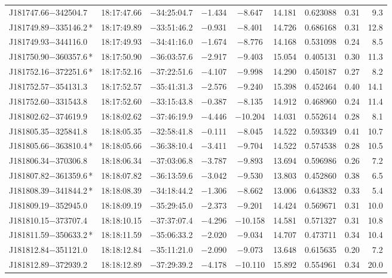 \begin{table*}
\begin{tabular}{lcccccccr}
J181747.66$-$342504.7 & 18:17:47.66 & $-$34:25:04.7 & $-$1.434 & $-$8.647 & 14.181 & 0.623088 & 0.31 & 9.3 \\
J181749.89$-$335146.2\,* & 18:17:49.89 & $-$33:51:46.2 & $-$0.931 & $-$8.401 & 14.726 & 0.686168 & 0.31 & 12.8 \\
J181749.93$-$344116.0 & 18:17:49.93 & $-$34:41:16.0 & $-$1.674 & $-$8.776 & 14.168 & 0.531098 & 0.24 & 8.5 \\
J181750.90$-$360357.6\,* & 18:17:50.90 & $-$36:03:57.6 & $-$2.917 & $-$9.403 & 15.054 & 0.405131 & 0.30 & 11.3 \\
J181752.16$-$372251.6\,* & 18:17:52.16 & $-$37:22:51.6 & $-$4.107 & $-$9.998 & 14.290 & 0.450187 & 0.27 & 8.2 \\
J181752.57$-$354131.3 & 18:17:52.57 & $-$35:41:31.3 & $-$2.576 & $-$9.240 & 15.398 & 0.452464 & 0.40 & 14.1 \\
J181752.60$-$331543.8 & 18:17:52.60 & $-$33:15:43.8 & $-$0.387 & $-$8.135 & 14.912 & 0.468960 & 0.24 & 11.4 \\
J181802.62$-$374619.9 & 18:18:02.62 & $-$37:46:19.9 & $-$4.446 & $-$10.204 & 14.031 & 0.552614 & 0.28 & 8.1 \\
J181805.35$-$325841.8 & 18:18:05.35 & $-$32:58:41.8 & $-$0.111 & $-$8.045 & 14.522 & 0.593349 & 0.41 & 10.7 \\
J181805.66$-$363810.4\,* & 18:18:05.66 & $-$36:38:10.4 & $-$3.411 & $-$9.704 & 14.522 & 0.574538 & 0.28 & 10.5 \\
J181806.34$-$370306.8 & 18:18:06.34 & $-$37:03:06.8 & $-$3.787 & $-$9.893 & 13.694 & 0.596986 & 0.26 & 7.2 \\
J181807.82$-$361359.6\,* & 18:18:07.82 & $-$36:13:59.6 & $-$3.042 & $-$9.530 & 13.803 & 0.452860 & 0.38 & 6.5 \\
J181808.39$-$341844.2\,* & 18:18:08.39 & $-$34:18:44.2 & $-$1.306 & $-$8.662 & 13.006 & 0.643832 & 0.33 & 5.4 \\
J181809.19$-$352945.0 & 18:18:09.19 & $-$35:29:45.0 & $-$2.373 & $-$9.201 & 14.424 & 0.569671 & 0.31 & 10.0 \\
J181810.15$-$373707.4 & 18:18:10.15 & $-$37:37:07.4 & $-$4.296 & $-$10.158 & 14.581 & 0.571327 & 0.31 & 10.8 \\
J181811.59$-$350633.2\,* & 18:18:11.59 & $-$35:06:33.2 & $-$2.020 & $-$9.034 & 14.707 & 0.473711 & 0.34 & 10.4 \\
J181812.84$-$351121.0 & 18:18:12.84 & $-$35:11:21.0 & $-$2.090 & $-$9.073 & 13.648 & 0.615635 & 0.20 & 7.2 \\
J181812.89$-$372939.2 & 18:18:12.89 & $-$37:29:39.2 & $-$4.178 & $-$10.110 & 15.892 & 0.554961 & 0.34 & 20.0 \\

\end{tabular}
\end{table*}
